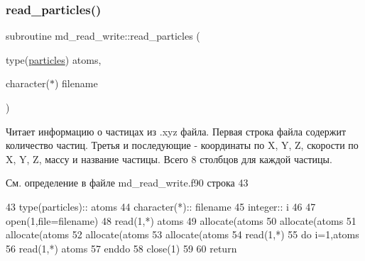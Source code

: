 \subsubsection{\texorpdfstring{read\+\_\+particles()}{read\_particles()}}
{\footnotesize\ttfamily subroutine md\+\_\+read\+\_\+write\+::read\+\_\+particles (\begin{DoxyParamCaption}\item[{type(\mbox{\hyperlink{structmd__general_1_1particles}{particles}})}]{atoms,  }\item[{character($\ast$)}]{filename }\end{DoxyParamCaption})}



Читает информацию о частицах из .xyz файла.  Первая строка файла содержит количество частиц. Третья и последующие -\/ координаты по X, Y, Z, скорости по X, Y, Z, массу и название частицы. Всего 8 столбцов для каждой частицы. 



См. определение в файле md\+\_\+read\+\_\+write.\+f90 строка 43


\begin{DoxyCode}
43     \textcolor{keywordtype}{type}(particles)::   atoms
44     \textcolor{keywordtype}{character(*)}::  filename
45     \textcolor{keywordtype}{integer}::       i
46 
47     \textcolor{keyword}{open}(1,file=filename)
48     \textcolor{keyword}{read}(1,*) atoms%
49     \textcolor{keyword}{allocate}(atoms%
50     \textcolor{keyword}{allocate}(atoms%
51     \textcolor{keyword}{allocate}(atoms%
52     \textcolor{keyword}{allocate}(atoms%
53     \textcolor{keyword}{allocate}(atoms%
54     \textcolor{keyword}{read}(1,*)
55     \textcolor{keywordflow}{do} i=1,atoms%
56         \textcolor{keyword}{read}(1,*) atoms%
57 \textcolor{keywordflow}{    enddo}
58     \textcolor{keyword}{close}(1)
59 
60     \textcolor{keywordflow}{return}
\end{DoxyCode}
\mbox{\label{namespacemd__read__write_a20f73c896cf124f2e1da6ccbf23cc12d}} 
